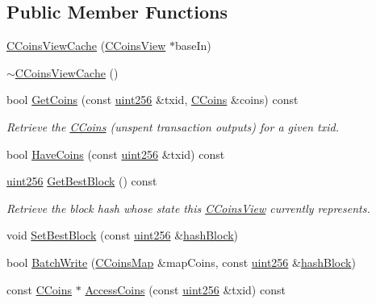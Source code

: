 \subsection*{Public Member Functions}
\begin{DoxyCompactItemize}
\item 
\hyperlink{class_c_coins_view_cache_a515a6f259af607fb3394b560d9c063c9}{C\+Coins\+View\+Cache} (\hyperlink{class_c_coins_view}{C\+Coins\+View} $\ast$base\+In)
\item 
\hyperlink{class_c_coins_view_cache_a6148421cb7605fb434f6c8622f39430b}{$\sim$\+C\+Coins\+View\+Cache} ()
\item 
bool \hyperlink{class_c_coins_view_cache_a27ec8311ae409ea1e3c3484c1d4a9035}{Get\+Coins} (const \hyperlink{classuint256}{uint256} \&txid, \hyperlink{class_c_coins}{C\+Coins} \&coins) const 
\begin{DoxyCompactList}\small\item\em Retrieve the \hyperlink{class_c_coins}{C\+Coins} (unspent transaction outputs) for a given txid. \end{DoxyCompactList}\item 
bool \hyperlink{class_c_coins_view_cache_a25dddabe8734fc9823112763494da72b}{Have\+Coins} (const \hyperlink{classuint256}{uint256} \&txid) const 
\item 
\hyperlink{classuint256}{uint256} \hyperlink{class_c_coins_view_cache_aabcd1da9f28445e09c9af5f68ce7f100}{Get\+Best\+Block} () const 
\begin{DoxyCompactList}\small\item\em Retrieve the block hash whose state this \hyperlink{class_c_coins_view}{C\+Coins\+View} currently represents. \end{DoxyCompactList}\item 
void \hyperlink{class_c_coins_view_cache_aa3f787f77b123f0fd340fbe4e458b4ad}{Set\+Best\+Block} (const \hyperlink{classuint256}{uint256} \&\hyperlink{class_c_coins_view_cache_a229dddddbc5501edc250209a2ce5df8b}{hash\+Block})
\item 
bool \hyperlink{class_c_coins_view_cache_a561bb7c6c97701b12c48fbbb563d0a91}{Batch\+Write} (\hyperlink{coins_8h_a2886ba2fd0428bae777e1cbcabc02834}{C\+Coins\+Map} \&map\+Coins, const \hyperlink{classuint256}{uint256} \&\hyperlink{class_c_coins_view_cache_a229dddddbc5501edc250209a2ce5df8b}{hash\+Block})
\item 
const \hyperlink{class_c_coins}{C\+Coins} $\ast$ \hyperlink{class_c_coins_view_cache_a2b72aa925d9c1a1bd662f7e2852059d9}{Access\+Coins} (const \hyperlink{classuint256}{uint256} \&txid) const 

\end{DoxyCompactItemize}
